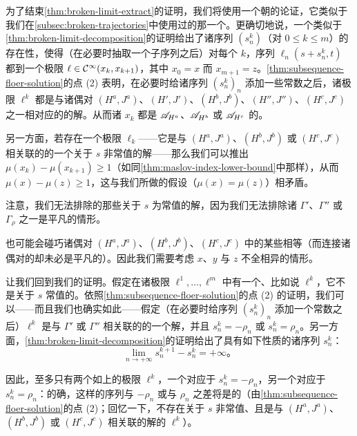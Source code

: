 为了结束\cref{thm:broken-limit-extract}的证明，我们将使用一个朝\trBrokenTrajectory{}\trConvergence{}的论证，它类似于我们在\cref{subsec:broken-trajectories}中使用过的那一个。更确切地说，一个类似于\cref{thm:broken-limit-decomposition}的证明给出了诸序列 $(s_{n}^{k})$（对 $0\le k\le m$）的存在性，使得（在必要时抽取一个子序列之后）对每个 $k$，序列 $\ell_{n}(s+s_{n}^{k},t)$ 都\trConvergence{}到一个极限 $\ell\in\mathcal{C}^{\infty}(x_{k},x_{k+1})$，其中 $x_{0}=x$ 而 $x_{m+1}=z$。\cref{thm:subsequence-floer-solution}的点 (2) 表明，在必要时给诸序列 $(s_{n}^{k})_{n}$ 添加一些常数之后，诸极限 $\ell^{k}$ 都是与诸偶对 $(H^{a},J^{a})$、$(H',J')$、$(H^{b},J^{b})$、$(H'',J'')$、$(H^{c},J^{c})$ 之一相对应的\trFloerEquation{}的解。从而诸\trLoop{} $x_{k}$ 都是 $\mathscr{A}_{H^{a}}$、$\mathscr{A}_{H^{b}}$ 或 $\mathscr{A}_{H^{c}}$ 的\trCriticalPoint。

另一方面，若存在一个极限 $\ell_{k}$——它是与 $(H^{a},J^{a})$、$(H^{b},J^{b})$ 或 $(H^{c},J^{c})$ 相关联的\trFloerEquation{}的一个关于 $s$ 非常值的解——那么我们可以推出 $\mu(x_{k})-\mu(x_{k+1})\ge1$（如同\cref{thm:maslov-index-lower-bound}中那样），从而 $\mu(x)-\mu(z)\ge1$，这与我们所做的假设（$\mu(x)=\mu(z)$）相矛盾。

\begin{remark}\label{thm:constant-solutions-allowed}
注意，我们无法排除\trFloerEquation{}的那些关于 $s$ 为常值的解，因为我们无法排除诸\trHomotopy{} $\Gamma'$、$\Gamma''$ 或 $\Gamma_{\rho}$ 之一是平凡的情形。

也可能会碰巧诸偶对 $(H^{a},J^{a})$、$(H^{b},J^{b})$、$(H^{c},J^{c})$ 中的某些相等（而连接诸偶对的\trHomotopy{}却未必是平凡的）。因此我们需要考虑 $x$、$y$ 与 $z$ 不全相异的情形。
\end{remark}

让我们回到我们的证明。假定在诸极限 $\ell^{1},\dotsc,\ell^{m}$ 中有一个、比如说 $\ell^{k}$，它不是关于 $s$ 常值的。依照\cref{thm:subsequence-floer-solution}的点 (2) 的证明，我们可以——而且我们也确实如此——假定（在必要时给序列 $(s_{n}^{k})_{n}$ 添加一个常数之后）$\ell^{k}$ 是与 $\Gamma'$ 或 $\Gamma''$ 相关联的\trFloerEquation{}的一个解，并且 $s_{n}^{k}=-\rho_{n}$ 或 $s_{n}^{k}=\rho_{n}$。另一方面，\cref{thm:broken-limit-decomposition}的证明给出了具有如下性质的诸序列 $s_{n}^{k}$：
\[
\lim_{n\to+\infty}s_{n}^{k+1}-s_{n}^{k}=+\infty\text{。}
\]

因此，至多只有两个如上的极限 $\ell^{k}$，一个对应于 $s_{n}^{k}=-\rho_{n}$，另一个对应于 $s_{n}^{k}=\rho_{n}$：的确，这样的序列与 $-\rho_{n}$ 或与 $\rho_{n}$ 之差将是\trBounded{}的（由\cref{thm:subsequence-floer-solution}的点 (2)；回忆一下，不存在关于 $s$ 非常值、且是与 $(H^{a},J^{a})$、$(H^{b},J^{b})$ 或 $(H^{c},J^{c})$ 相关联的\trFloer{}解的 $\ell^{k}$）。

